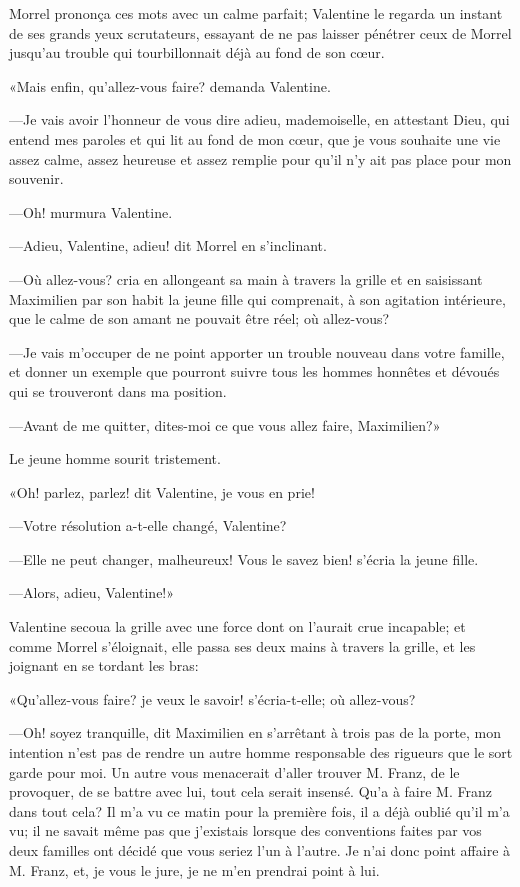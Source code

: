 Morrel prononça ces mots avec un calme parfait; Valentine le regarda un instant de ses grands yeux scrutateurs, essayant de ne pas laisser pénétrer ceux de Morrel jusqu'au trouble qui tourbillonnait déjà au fond de son cœur. 

«Mais enfin, qu'allez-vous faire? demanda Valentine. 

—Je vais avoir l'honneur de vous dire adieu, mademoiselle, en attestant Dieu, qui entend mes paroles et qui lit au fond de mon cœur, que je vous souhaite une vie assez calme, assez heureuse et assez remplie pour qu'il n'y ait pas place pour mon souvenir. 

—Oh! murmura Valentine. 

—Adieu, Valentine, adieu! dit Morrel en s'inclinant. 

—Où allez-vous? cria en allongeant sa main à travers la grille et en saisissant Maximilien par son habit la jeune fille qui comprenait, à son agitation intérieure, que le calme de son amant ne pouvait être réel; où allez-vous? 

—Je vais m'occuper de ne point apporter un trouble nouveau dans votre famille, et donner un exemple que pourront suivre tous les hommes honnêtes et dévoués qui se trouveront dans ma position. 

—Avant de me quitter, dites-moi ce que vous allez faire, Maximilien?» 

Le jeune homme sourit tristement. 

«Oh! parlez, parlez! dit Valentine, je vous en prie! 

—Votre résolution a-t-elle changé, Valentine? 

—Elle ne peut changer, malheureux! Vous le savez bien! s'écria la jeune fille. 

—Alors, adieu, Valentine!» 

Valentine secoua la grille avec une force dont on l'aurait crue incapable; et comme Morrel s'éloignait, elle passa ses deux mains à travers la grille, et les joignant en se tordant les bras: 

«Qu'allez-vous faire? je veux le savoir! s'écria-t-elle; où allez-vous? 

—Oh! soyez tranquille, dit Maximilien en s'arrêtant à trois pas de la porte, mon intention n'est pas de rendre un autre homme responsable des rigueurs que le sort garde pour moi. Un autre vous menacerait d'aller trouver M. Franz, de le provoquer, de se battre avec lui, tout cela serait insensé. Qu'a à faire M. Franz dans tout cela? Il m'a vu ce matin pour la première fois, il a déjà oublié qu'il m'a vu; il ne savait même pas que j'existais lorsque des conventions faites par vos deux familles ont décidé que vous seriez l'un à l'autre. Je n'ai donc point affaire à M. Franz, et, je vous le jure, je ne m'en prendrai point à lui. 

